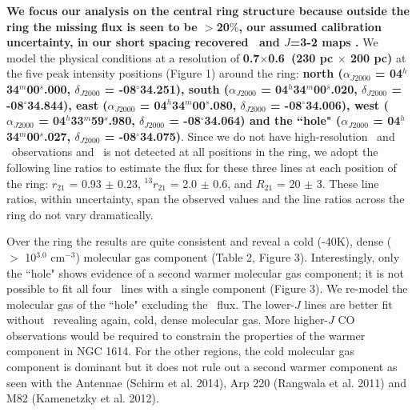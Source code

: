 \textbf{We focus our analysis on the central ring structure because outside the ring the missing flux is seen to be $>$20$\%$, our assumed calibration uncertainty, in our short spacing recovered \cotwo\ and $J$=3-2 maps .} We model the physical conditions at a resolution of \textbf{0.7\arcsec$\times$0.6\arcsec\ (230 pc $\times$ 200 pc)} at the five peak intensity positions (Figure 1) around the ring: 
\textbf{north ($\alpha_{J2000}$ = 04$^{h}$34$^{m}$00$^{s}$.000, $\delta_{J2000}$ = -08$^{\circ}$34\arcsec.251), 
south ($\alpha_{J2000}$ = 04$^{h}$34$^{m}$00$^{s}$.020, $\delta_{J2000}$ = -08$^{\circ}$34\arcsec.844), 
east ($\alpha_{J2000}$ = 04$^{h}$34$^{m}$00$^{s}$.080, $\delta_{J2000}$ = -08$^{\circ}$34\arcsec.006), 
west ($\alpha_{J2000}$ = 04$^{h}$33$^{m}$59$^{s}$.980, $\delta_{J2000}$ = -08$^{\circ}$34\arcsec.064) 
and the ``hole" ($\alpha_{J2000}$ = 04$^{h}$34$^{m}$00$^{s}$.027, $\delta_{J2000}$ = -08$^{\circ}$34\arcsec.075)}. Since we do not have high-resolution \co\ and \tcoone\ observations and \tcotwo\ is not detected at all positions in the ring, we adopt the following line ratios to estimate the flux for these three lines at each position of the ring: $r_{21}$ = 0.93 $\pm$ 0.23, $^{13}r_{21}$ = 2.0 $\pm$ 0.6, and $R_{21}$ = 20 $\pm$ 3. These line ratios, within uncertainty, span the observed values and the line ratios across the ring do not vary dramatically. 

Over the ring the results are quite consistent and reveal a cold (-40K), dense (\nhtwo\ $>$ 10$^{3.0}$ cm$^{-3}$) molecular gas component (Table 2, Figure 3). Interestingly, only the ``hole" shows evidence of a second warmer molecular gas component; it is not possible to fit all four \co\ lines with a single component (Figure 3). We re-model the molecular gas of the ``hole" excluding the \cosix\ flux. The lower-$J$ lines are better fit without \cosix\ revealing again, cold, dense molecular gas. More higher-$J$ CO observations would be required to constrain the properties of the warmer component in NGC 1614. For the other regions, the cold molecular gas component is dominant but it does not rule out a second warmer component as seen with the Antennae (Schirm et al. 2014), Arp 220 (Rangwala et al. 2011) and M82 (Kamenetzky et al. 2012).

